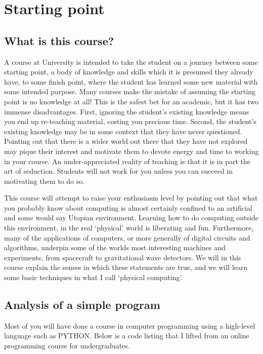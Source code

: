 \documentclass[../physical_computing.tex]{subfiles}
\begin{document}
\chapter{Starting point}

\section{What is this course?}
\label{sec:whatisit}

A course at University is intended to take the student on a journey between some starting point, a body of knowledge and skills which it is presumed they already have, to some finish point, where the student has learned some new material with some intended purpose. Many courses make the mistake of assuming the starting point is no knowledge at all! This is the safest bet for an academic, but it has two immense disadvantages. First, ignoring the student's existing knowledge means you end up re-teaching material, costing you precious time. Second, the student's existing knowledge may be in some context that they have never questioned. Pointing out that there is a wider world out there that they have not explored may pique their interest and motivate them to devote energy and time to working in your course. An under-appreciated reality of teaching is that it is in part the art of seduction. Students will not work for you unless you can succeed in motivating them to do so.

This course will attempt to raise your enthusiasm level by pointing out that what you probably know about computing is almost certainly confined to an artificial and some would say Utopian environment. Learning how to do computing outside this environment, in the real `physical' world is liberating and fun. Furthermore, many of the applications of computers, or more generally of digital circuits and algorithms, underpin some of the worlds most interesting machines and experiments, from spacecraft to gravitational wave detectors. We will in this course explain the senses in which these statements are true, and we will learn some basic techniques in what I call `physical computing'.

\section{Analysis of a simple program}
\label{sec:projectforstudents}

Most of you will have done a course in computer programming using a high-level language such as PYTHON. Below is a code listing that I lifted from an online programming course for undergraduates.
\end{document}
